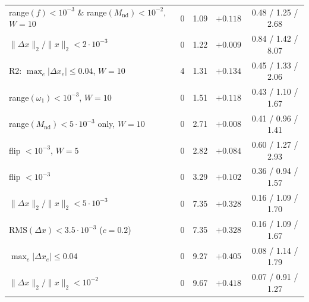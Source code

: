 \documentclass[11pt,a4paper]{article}
\newcommand{\Mnd}{M_{\mathrm{nd}}}
\newcommand{\dx}{\Delta x}
\newcommand{\maxdx}{\max_e|\Delta x_e|}
\newcommand{\relL}{\|\Delta x\|_2/\|x\|_2}
\newcommand{\RMS}{\mathrm{RMS}}
\begin{document}
\begin{table}[htbp]
\begin{tabular}{@{}lcccc@{}}
range$(f)<10^{-3}$ \& range$(\Mnd)<10^{-2}$, $W{=}10$     & 0 & 1.09 & $+0.118$ & 0.48 / 1.25 / 2.68 \\
$\relL < 2\cdot10^{-3}$                                 & 0 & 1.22 & $+0.009$ & 0.84 / 1.42 / 8.07 \\
R2: $\maxdx \le 0.04$, $W{=}10$                          & 4 & 1.31 & $+0.134$ & 0.45 / 1.33 / 2.06 \\
range$(\omega_1)<10^{-3}$, $W{=}10$                      & 0 & 1.51 & $+0.118$ & 0.43 / 1.10 / 1.67 \\
range$(\Mnd) < 5\cdot10^{-3}$ only, $W{=}10$             & 0 & 2.71 & $+0.008$ & 0.41 / 0.96 / 1.41 \\
flip $<10^{-3}$, $W{=}5$                                 & 0 & 2.82 & $+0.084$ & 0.60 / 1.27 / 2.93 \\
flip $<10^{-3}$                                         & 0 & 3.29 & $+0.102$ & 0.36 / 0.94 / 1.57 \\
$\relL < 5\cdot10^{-3}$                                 & 0 & 7.35 & $+0.328$ & 0.16 / 1.09 / 1.70 \\
$\RMS(\dx) < 3.5\cdot10^{-3}$ ($c{=}0.2$)                & 0 & 7.35 & $+0.328$ & 0.16 / 1.09 / 1.67 \\
$\maxdx \le 0.04$                                       & 0 & 9.27 & $+0.405$ & 0.08 / 1.14 / 1.79 \\
$\relL < 10^{-2}$                                       & 0 & 9.67 & $+0.418$ & 0.07 / 0.91 / 1.27 \\
\bottomrule
\end{tabular}
\end{table}



\end{document}
